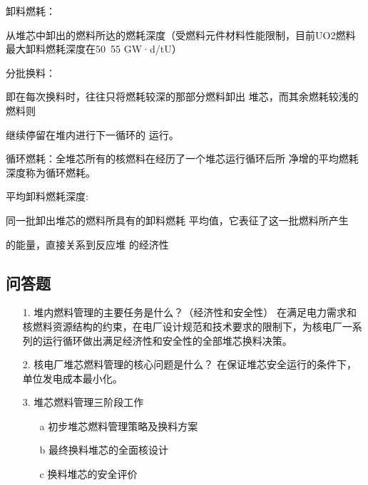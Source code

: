 \documentclass[openany]{ctexart}
\numberwithin{equation}{section} %
\begin{document}
卸料燃耗：\hspace{0.11111em}
\begin{minipage}[t]{\linewidth}
	从堆芯中卸出的燃料所达的燃耗深度（受燃料元件材料性能限制，目前UO2燃料最大卸\newline 料燃耗深度在50~55 GW·d/tU）
\end{minipage}
\vspace{0.005ex}


分批换料：\hspace{0.11111em}
\begin{minipage}[t]{\linewidth}
	即在每次换料时，往往只将燃耗较深的那部分燃料卸出
	堆芯，而其余燃耗较浅的燃料则
	
	继续停留在堆内进行下一循环的
	运行。
\end{minipage}
\vspace{0.05cm}

循环燃耗：全堆芯所有的核燃料在经历了一个堆芯运行循环后所
净增的平均燃耗深度称为循环燃耗。

平均卸料燃耗深度: \hspace{0.11111em}
\begin{minipage}[t]{\linewidth}
	同一批卸出堆芯的燃料所具有的卸料燃耗
	平均值，它表征了这一批燃料所产生
	
	的能量，直接关系到反应堆
	的经济性
\end{minipage}
\vspace{0.005ex}


\subsection{问答题}

\begin{itemize}
	\item[1.] 堆内燃料管理的主要任务是什么？（经济性和安全性）\newline
	在满足电力需求和核燃料资源结构的约束，在电厂设计规范和技术要求的限制下，为核电厂一系列的运行循环做出满足经济性和安全性的全部堆芯换料决策。
	
	\vspace{1.5ex}
	
	\item[2.] 核电厂堆芯燃料管理的核心问题是什么？\newline
	在保证堆芯安全运行的条件下，单位发电成本最小化。
	
	\vspace{1.5ex}
	
	\item[3.] 堆芯燃料管理三阶段工作
	\begin{itemize}
		\item[a] 初步堆芯燃料管理策略及换料方案
		\item[b] 最终换料堆芯的全面核设计
		\item[c] 换料堆芯的安全评价
	\end{itemize}
	
\end{itemize}
\end{document}
